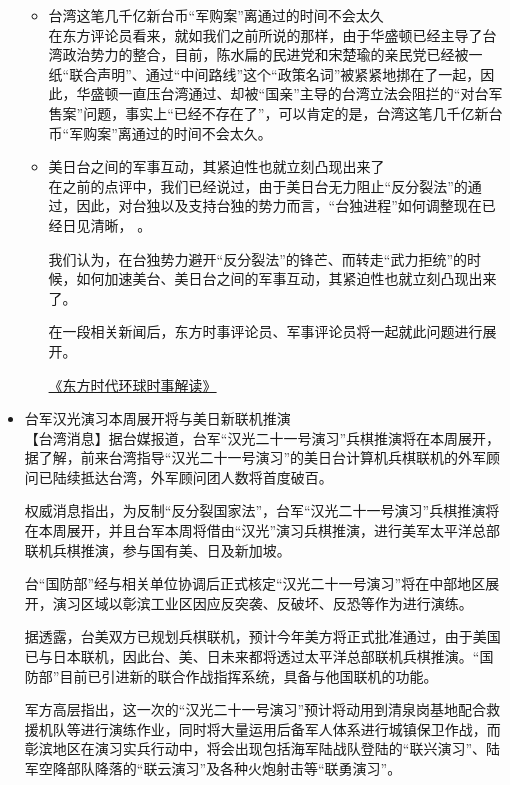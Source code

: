\documentclass[a4paper,11pt]{article}
\begin{document}
\begin{itemize}
\begin{itemize}
\item 台湾这笔几千亿新台币“军购案”离通过的时间不会太久\\
\label{sec-3_1_2}%
在东方评论员看来，就如我们之前所说的那样，由于华盛顿已经主导了台湾政治势力的整合，目前，陈水扁的民进党和宋楚瑜的亲民党已经被一纸“联合声明”、通过“中间路线”这个“政策名词”被紧紧地挷在了一起，因此，华盛顿一直压台湾通过、却被“国亲”主导的台湾立法会阻拦的“对台军售案”问题，事实上“已经不存在了”，可以肯定的是，台湾这笔几千亿新台币“军购案”离通过的时间不会太久。
 

\item 美日台之间的军事互动，其紧迫性也就立刻凸现出来了\\
\label{sec-3_1_3}%
在之前的点评中，我们已经说过，由于美日台无力阻止“反分裂法”的通过，因此，对台独以及支持台独的势力而言，“台独进程”如何调整现在已经日见清晰，
    。

    我们认为，在台独势力避开“反分裂法”的锋芒、而转走“武力拒统”的时候，如何加速美台、美日台之间的军事互动，其紧迫性也就立刻凸现出来了。

    在一段相关新闻后，东方时事评论员、军事评论员将一起就此问题进行展开。

    \href{http://www.dongfangtime.com}{《东方时代环球时事解读》}

\end{itemize} %

\item 台军汉光演习本周展开将与美日新联机推演\\
\label{sec-3_2}%
【台湾消息】据台媒报道，台军“汉光二十一号演习”兵棋推演将在本周展开，据了解，前来台湾指导“汉光二十一号演习”的美日台计算机兵棋联机的外军顾问已陆续抵达台湾，外军顾问团人数将首度破百。

   权威消息指出，为反制“反分裂国家法”，台军“汉光二十一号演习”兵棋推演将在本周展开，并且台军本周将借由“汉光”演习兵棋推演，进行美军太平洋总部联机兵棋推演，参与国有美、日及新加坡。

   台“国防部”经与相关单位协调后正式核定“汉光二十一号演习”将在中部地区展开，演习区域以彰滨工业区因应反突袭、反破坏、反恐等作为进行演练。

   据透露，台美双方已规划兵棋联机，预计今年美方将正式批准通过，由于美国已与日本联机，因此台、美、日未来都将透过太平洋总部联机兵棋推演。“国防部”目前已引进新的联合作战指挥系统，具备与他国联机的功能。

   军方高层指出，这一次的“汉光二十一号演习”预计将动用到清泉岗基地配合救援机队等进行演练作业，同时将大量运用后备军人体系进行城镇保卫作战，而彰滨地区在演习实兵行动中，将会出现包括海军陆战队登陆的“联兴演习”、陆军空降部队降落的“联云演习”及各种火炮射击等“联勇演习”。


\end{itemize}
\end{document}

